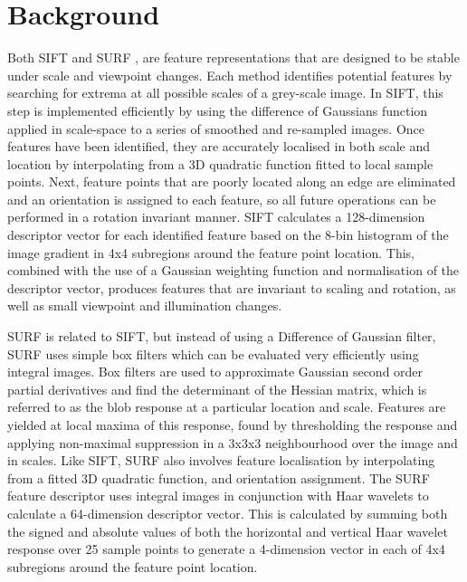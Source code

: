 \documentclass[runningheads,a4paper]{llncs}
\begin{document}
\section{Background}
 \label{sec:related}
Both SIFT \cite{lowe2004SIFT} and SURF \cite{bay2006SURF}, \cite{bay2008SURF} are feature representations that are designed to be stable under scale and viewpoint changes. Each method identifies potential features by searching for extrema at all possible scales of a grey-scale image. In SIFT, this step is implemented efficiently by using the difference of Gaussians function applied in scale-space to a series of smoothed and re-sampled images. Once features have been identified, they are accurately localised in both scale and location by interpolating from a 3D quadratic function fitted to local sample points. Next, feature points that are poorly located along an edge are eliminated and an orientation is assigned to each feature, so all future operations can be performed in a rotation invariant manner. SIFT calculates a 128-dimension descriptor vector for each identified feature based on the 8-bin histogram of the image gradient in 4x4 subregions around the feature point location. This, combined with the use of a Gaussian weighting function and normalisation of the descriptor vector, produces features that are invariant to scaling and rotation, as well as small viewpoint and illumination changes. 

SURF is related to SIFT, but instead of using a Difference of Gaussian filter, SURF uses simple box filters which can be evaluated very efficiently using integral images. Box filters are used to approximate Gaussian second order partial derivatives and find the determinant of the Hessian matrix, which is referred to as the blob response at a particular location and scale. Features are yielded at local maxima of this response, found by thresholding the response and applying non-maximal suppression in a 3x3x3 neighbourhood over the image and in scales. Like SIFT, SURF also involves feature localisation by interpolating from a fitted 3D quadratic function, and orientation assignment. The SURF feature descriptor uses integral images in conjunction with Haar wavelets to calculate a 64-dimension descriptor vector. This is calculated by summing both the signed and absolute values of both the horizontal and vertical Haar wavelet response over 25 sample points to generate a 4-dimension vector in each of 4x4 subregions around the feature point location. 
\end{document}
